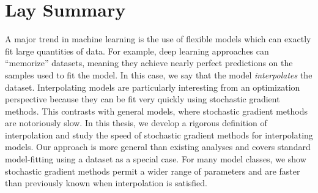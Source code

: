 

\chapter{Lay Summary}

A major trend in machine learning is the use of flexible models which can exactly fit large quantities of data. 
For example, deep learning approaches can ``memorize'' datasets, meaning they achieve nearly perfect predictions on the samples used to fit the model. 
In this case, we say that the model \emph{interpolates} the dataset.
Interpolating models are particularly interesting from an optimization perspective because they can be fit very quickly using stochastic gradient methods. 
This contrasts with general models, where stochastic gradient methods are notoriously slow. 
In this thesis, we develop a rigorous definition of interpolation and study the speed of stochastic gradient methods for interpolating models.  
Our approach is more general than existing analyses and covers standard model-fitting using a dataset as a special case. 
For many model classes, we show stochastic gradient methods permit a wider range of parameters and are faster than previously known when interpolation is satisfied. 
